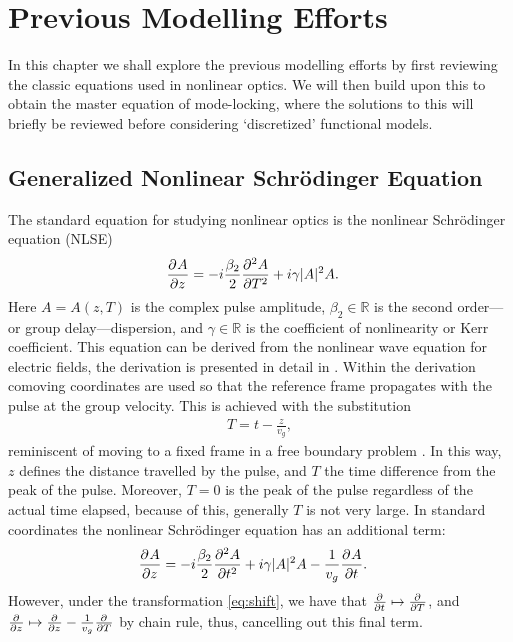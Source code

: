 
\chapter{Previous Modelling Efforts}
In this chapter we shall explore the previous modelling efforts by first reviewing the classic equations used in nonlinear optics. We will then build upon this to obtain the master equation of mode-locking, where the solutions to this will briefly be reviewed before considering `discretized' functional models. \\

\section{Generalized Nonlinear Schr\"odinger Equation}
The standard equation for studying nonlinear optics is the nonlinear Schr\"odinger equation (NLSE) \cite{agrawal2013, anderson, burgoyne2007, desurvire, ferreira, finot, rothenberg}
\begin{align*}
\pdiff{A}{z} &= - i \frac{\beta_2}{2}\pdiff[2]{A}{T} + i \gamma |A|^2 A.
\end{align*}
Here $A = A(z, T)$ is the complex pulse amplitude, $\beta_2 \in \mathbb{R}$ is the second order---or group delay---dispersion, and $\gamma \in \mathbb{R}$ is the coefficient of nonlinearity or Kerr coefficient. This equation can be derived from the nonlinear wave equation for electric fields, the derivation is presented in detail in \cite{agrawal2013, ferreira}. Within the derivation comoving coordinates are used so that the reference frame propagates with the pulse at the group velocity. This is achieved with the substitution
\begin{align}
\label{eq:shift}
T = t - \frac{z}{v_g},
\end{align}
reminiscent of moving to a fixed frame in a free boundary problem \cite{ockendon}. In this way, $z$ defines the distance travelled by the pulse, and $T$ the time difference from the peak of the pulse. Moreover, $T = 0$ is the peak of the pulse regardless of the actual time elapsed, because of this, generally $T$ is not very large. In standard coordinates the nonlinear Schr\"odinger equation has an additional term:
\begin{align*}
\pdiff{A}{z} &= - i \frac{\beta_2}{2}\pdiff[2]{A}{t} + i \gamma |A|^2 A - \frac{1}{v_g} \pdiff{A}{t}.
\end{align*}
However, under the transformation \eqref{eq:shift}, we have that $\pdiff{}{t} \mapsto \pdiff{}{T}$, and $\pdiff{}{z} \mapsto \pdiff{}{z} - \frac{1}{v_g} \pdiff{}{T}$ by chain rule, thus, cancelling out this final term. \\

